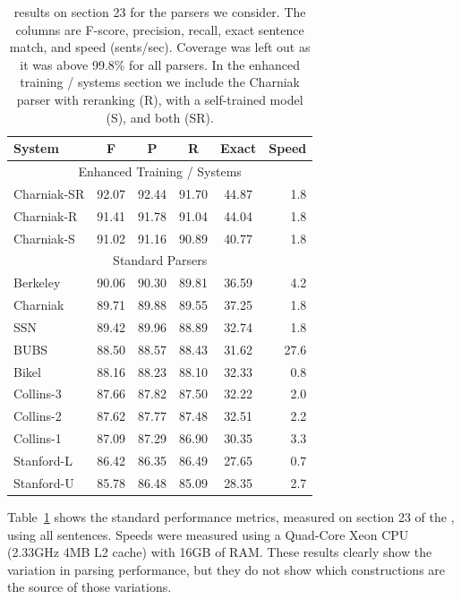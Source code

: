 \begin{table}
\begin{center}
\begin{tabular}{|lccccr|}
	\hline
		System & F & P & R & Exact & Speed \\
	\hline
	\hline
		\multicolumn{6}{|c|}{Enhanced Training / Systems} \\
		Charniak-SR & 92.07 & 92.44 & 91.70 & 44.87 & 1.8 \\
		Charniak-R & 91.41 & 91.78 & 91.04 & 44.04 & 1.8 \\
		Charniak-S & 91.02 & 91.16 & 90.89 & 40.77 & 1.8 \\
	\hline
		\multicolumn{6}{|c|}{Standard Parsers} \\
		Berkeley & 90.06 & 90.30 & 89.81 & 36.59 & 4.2 \\
		Charniak & 89.71 & 89.88 & 89.55 & 37.25 & 1.8 \\
		SSN & 89.42 & 89.96 & 88.89 & 32.74 & 1.8 \\
		BUBS & 88.50 & 88.57 & 88.43 & 31.62 & 27.6 \\
		Bikel & 88.16 & 88.23 & 88.10 & 32.33 & 0.8 \\
		Collins-3 & 87.66 & 87.82 & 87.50 & 32.22 & 2.0 \\
		Collins-2 & 87.62 & 87.77 & 87.48 & 32.51 & 2.2 \\
		Collins-1 & 87.09 & 87.29 & 86.90 & 30.35 & 3.3 \\
		Stanford-L & 86.42 & 86.35 & 86.49 & 27.65 & 0.7 \\
		Stanford-U & 85.78 & 86.48 & 85.09 & 28.35 & 2.7 \\
	\hline
\end{tabular}
\caption[\parseval results on \wsj section 23 for the parsers we consider.]{ \label{tab:standard-results} 
	\parseval results on \wsj section 23 for the parsers we consider.
  The columns are F-score, precision, recall, exact sentence match, and speed (sents/sec).
  Coverage was left out as it was above 99.8\% for all parsers.  In the {enhanced training /
	systems} section we include the Charniak parser with reranking (R), with a
	self-trained model (S), and both (SR).
}
\end{center}
\end{table}

Table~\ref{tab:standard-results} shows the standard performance metrics,
measured on section 23 of the \wsj, using all sentences.  Speeds were measured
using a Quad-Core Xeon CPU (2.33GHz 4MB L2 cache) with 16GB of RAM.
These results clearly show the variation in parsing performance, but they do
not show which constructions are the source of those variations.

